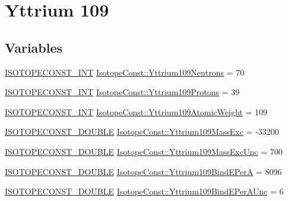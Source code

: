 \hypertarget{group___isotope_const-_yttrium-_y109}{}\section{Yttrium 109}
\label{group___isotope_const-_yttrium-_y109}
\subsection*{Variables}
\begin{DoxyCompactItemize}
\item 
\mbox{\hyperlink{group___isotope_const-_macros_ga5f18360b3e99483a35c32d789e62621c}{I\+S\+O\+T\+O\+P\+E\+C\+O\+N\+S\+T\+\_\+\+I\+NT}} \mbox{\hyperlink{group___isotope_const-_yttrium-_y109_ga5321a8a57f23376c8ed6242ab5a932f0}{Isotope\+Const\+::\+Yttrium109\+Neutrons}} = 70
\item 
\mbox{\hyperlink{group___isotope_const-_macros_ga5f18360b3e99483a35c32d789e62621c}{I\+S\+O\+T\+O\+P\+E\+C\+O\+N\+S\+T\+\_\+\+I\+NT}} \mbox{\hyperlink{group___isotope_const-_yttrium-_y109_ga9112e660f3e8d6615884e844a93a1e20}{Isotope\+Const\+::\+Yttrium109\+Protons}} = 39
\item 
\mbox{\hyperlink{group___isotope_const-_macros_ga5f18360b3e99483a35c32d789e62621c}{I\+S\+O\+T\+O\+P\+E\+C\+O\+N\+S\+T\+\_\+\+I\+NT}} \mbox{\hyperlink{group___isotope_const-_yttrium-_y109_ga8750c6a6b274a131eb779ce35504f7db}{Isotope\+Const\+::\+Yttrium109\+Atomic\+Weight}} = 109
\item 
\mbox{\hyperlink{group___isotope_const-_macros_ga8f45a7272ce02c0b4c65c44636ed719a}{I\+S\+O\+T\+O\+P\+E\+C\+O\+N\+S\+T\+\_\+\+D\+O\+U\+B\+LE}} \mbox{\hyperlink{group___isotope_const-_yttrium-_y109_ga18e02c1d8d52ffc57ec7fa7f80339cd2}{Isotope\+Const\+::\+Yttrium109\+Mass\+Exc}} = -\/33200
\item 
\mbox{\hyperlink{group___isotope_const-_macros_ga8f45a7272ce02c0b4c65c44636ed719a}{I\+S\+O\+T\+O\+P\+E\+C\+O\+N\+S\+T\+\_\+\+D\+O\+U\+B\+LE}} \mbox{\hyperlink{group___isotope_const-_yttrium-_y109_ga70a160cf5a89aff8300215f13b838468}{Isotope\+Const\+::\+Yttrium109\+Mass\+Exc\+Unc}} = 700
\item 
\mbox{\hyperlink{group___isotope_const-_macros_ga8f45a7272ce02c0b4c65c44636ed719a}{I\+S\+O\+T\+O\+P\+E\+C\+O\+N\+S\+T\+\_\+\+D\+O\+U\+B\+LE}} \mbox{\hyperlink{group___isotope_const-_yttrium-_y109_ga662783bbe25bd0d38b363ad889e5ae41}{Isotope\+Const\+::\+Yttrium109\+Bind\+E\+PerA}} = 8096
\item 
\mbox{\hyperlink{group___isotope_const-_macros_ga8f45a7272ce02c0b4c65c44636ed719a}{I\+S\+O\+T\+O\+P\+E\+C\+O\+N\+S\+T\+\_\+\+D\+O\+U\+B\+LE}} \mbox{\hyperlink{group___isotope_const-_yttrium-_y109_ga21c569dd22a5fb6862f28736c29247c6}{Isotope\+Const\+::\+Yttrium109\+Bind\+E\+Per\+A\+Unc}} = 6

\end{DoxyCompactItemize}

